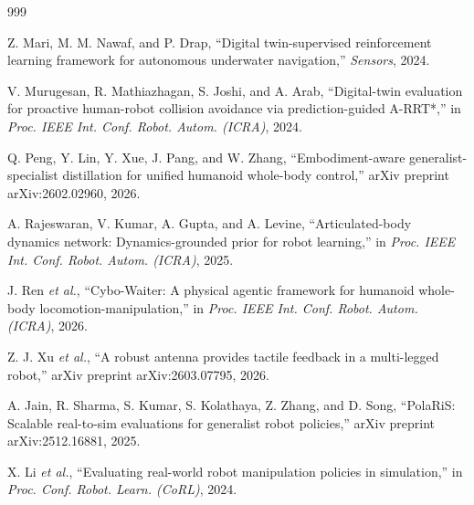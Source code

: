 \documentclass[12pt,a4paper,oneside]{report}
\begin{document}
\begin{thebibliography}{999}

Z. Mari, M. M. Nawaf, and P. Drap, ``Digital twin-supervised reinforcement learning framework for autonomous underwater navigation,'' \textit{Sensors}, 2024.




V. Murugesan, R. Mathiazhagan, S. Joshi, and A. Arab, ``Digital-twin evaluation for proactive human-robot collision avoidance via prediction-guided A-RRT*,'' in \textit{Proc. IEEE Int. Conf. Robot. Autom. (ICRA)}, 2024.




Q. Peng, Y. Lin, Y. Xue, J. Pang, and W. Zhang, ``Embodiment-aware generalist-specialist distillation for unified humanoid whole-body control,'' arXiv preprint arXiv:2602.02960, 2026.








A. Rajeswaran, V. Kumar, A. Gupta, and A. Levine, ``Articulated-body dynamics network: Dynamics-grounded prior for robot learning,'' in \textit{Proc. IEEE Int. Conf. Robot. Autom. (ICRA)}, 2025.




J. Ren \textit{et al.}, ``Cybo-Waiter: A physical agentic framework for humanoid whole-body locomotion-manipulation,'' in \textit{Proc. IEEE Int. Conf. Robot. Autom. (ICRA)}, 2026.




Z. J. Xu \textit{et al.}, ``A robust antenna provides tactile feedback in a multi-legged robot,'' arXiv preprint arXiv:2603.07795, 2026.




A. Jain, R. Sharma, S. Kumar, S. Kolathaya, Z. Zhang, and D. Song, ``{PolaRiS}: Scalable real-to-sim evaluations for generalist robot policies,'' arXiv preprint arXiv:2512.16881, 2025.




X. Li \textit{et al.}, ``Evaluating real-world robot manipulation policies in simulation,'' in \textit{Proc. Conf. Robot. Learn. (CoRL)}, 2024.




\end{thebibliography}
\end{document}
